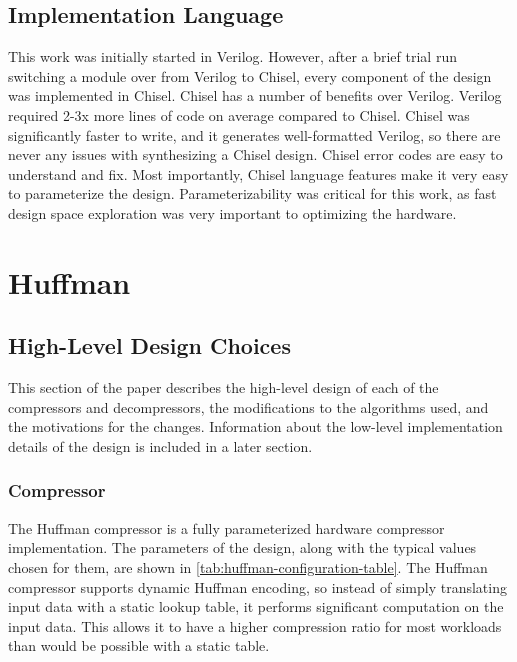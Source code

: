 \documentclass[doublespace,nopageskip]{VTthesis}
\begin{document}
\subsection{Implementation Language}\label{ss:implementation_language}
This work was initially started in Verilog. However, after a brief trial run switching a module over from Verilog to Chisel, every component of the design was implemented in Chisel. Chisel has a number of benefits over Verilog. Verilog required 2-3x more lines of code on average compared to Chisel. Chisel was significantly faster to write, and it generates well-formatted Verilog, so there are never any issues with synthesizing a Chisel design. Chisel error codes are easy to understand and fix. Most importantly, Chisel language features make it very easy to parameterize the design. Parameterizability was critical for this work, as fast design space exploration was very important to optimizing the hardware.

\section{Huffman}\label{ss:huffman}
\subsection{High-Level Design Choices}\label{se:huffman_design_choices}
This section of the paper describes the high-level design of each of the compressors and decompressors, the modifications to the algorithms used, and the motivations for the changes. Information about the low-level implementation details of the design is included in a later section.

\subsubsection{Compressor}\label{sss:huffman_compressor_design}
The Huffman compressor is a fully parameterized hardware compressor implementation. The parameters of the design, along with the typical values chosen for them, are shown in \ref{tab:huffman-configuration-table}. The Huffman compressor supports dynamic Huffman encoding, so instead of simply translating input data with a static lookup table, it performs significant computation on the input data. This allows it to have a higher compression ratio for most workloads than would be possible with a static table.
\end{document}
